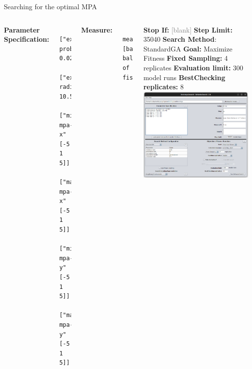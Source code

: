 \documentclass[table, 14pt, aspectratio=169]{beamer}
\newcommand{\hl}[1]{\textcolor{OxfordBlue}{\textbf{#1}}}
\begin{document}
\begin{frame}[fragile=singleslide]{Searching for the optimal MPA}
  \begin{columns}[T]
    \scriptsize
    \hl{Parameter Specification:}
    \vskip1mm
    \begin{verbatim} 
 ["exploration-probability" 0.021]
 ["exploration-radius" 10.578]
 ["min-mpa-x" [-5 1 5]]
 ["max-mpa-x" [-5 1 5]]
 ["min-mpa-y" [-5 1 5]]
 ["max-mpa-y" [-5 1 5]]
    \end{verbatim}
    \vskip2mm
    \hl{Measure:}
    \vskip1mm
    \begin{verbatim} 
 mean [bank-balance] of fishers
    \end{verbatim}
    \vskip2mm
    \hl{Stop If:} \textcolor{gray}{[blank]}
    \vskip2mm
    \hl{Step Limit:} 35040
    \vskip2mm
    \hl{Search Method}: StandardGA
    \vskip2mm
    \hl{Goal:} Maximize Fitness
    \vskip2mm
    \hl{Fixed Sampling:} 4 replicates
    \vskip2mm
    \hl{Evaluation limit:} 300 model runs
    \vskip2mm
    \hl{BestChecking replicates:} 8
    \includegraphics[width=\linewidth]{images/bsearch_mpa.png}
  \end{columns}
\end{frame}
\end{document}
